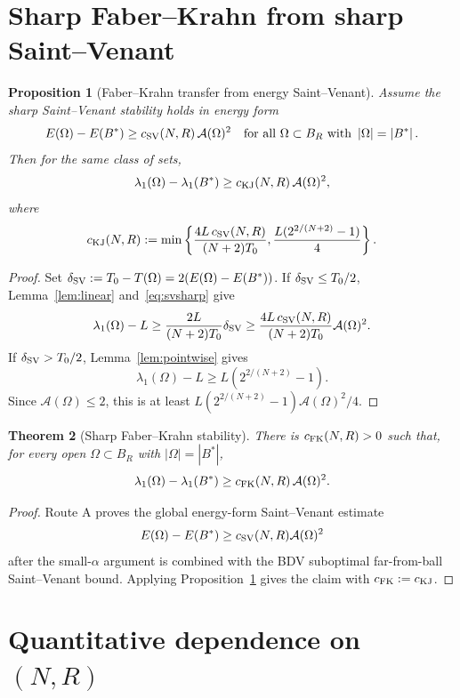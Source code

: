 \documentclass[11pt]{article}
\newtheorem{theorem}{Theorem}
\newtheorem{proposition}[theorem]{Proposition}
\theoremstyle{definition}
\newcommand{\abs}[1]{\left|#1\right|}
\begin{document}
\section{Sharp Faber--Krahn from sharp Saint--Venant}

\begin{proposition}[Faber--Krahn transfer from energy Saint--Venant]\label{prop:svtofk}
Assume the sharp Saint--Venant stability holds in energy form
\begin{equation}\label{eq:svsharp}
E(\Omega)-E(B^*)\ge c_{\rm SV}(N,R)\,\mathcal A(\Omega)^2
\quad\hbox{for all }\Omega\subset B_R\hbox{ with }\abs{\Omega}=\abs{B^*}.
\end{equation}
Then for the same class of sets,
\[
\lambda_1(\Omega)-\lambda_1(B^*)
\ge c_{\rm KJ}(N,R)\,\mathcal A(\Omega)^2,
\]
where
\[
c_{\rm KJ}(N,R):=
\min\left\{
\frac{4L\,c_{\rm SV}(N,R)}{(N+2)T_0},
\frac{L(2^{2/(N+2)}-1)}{4}
\right\}.
\]
\end{proposition}

\begin{proof}
Set $\delta_{\rm SV}:=T_0-T(\Omega)=2(E(\Omega)-E(B^*))$. If
$\delta_{\rm SV}\le T_0/2$, Lemma~\ref{lem:linear} and~\eqref{eq:svsharp}
give
\[
\lambda_1(\Omega)-L
\ge \frac{2L}{(N+2)T_0}\delta_{\rm SV}
\ge \frac{4L\,c_{\rm SV}(N,R)}{(N+2)T_0}\mathcal A(\Omega)^2.
\]
If $\delta_{\rm SV}>T_0/2$, Lemma~\ref{lem:pointwise} gives
\[
\lambda_1(\Omega)-L\ge L\left(2^{2/(N+2)}-1\right).
\]
Since $\mathcal A(\Omega)\le2$, this is at least
$L(2^{2/(N+2)}-1)\mathcal A(\Omega)^2/4$.
\end{proof}

\begin{theorem}[Sharp Faber--Krahn stability]\label{thm:fk}
There is $c_{\rm FK}(N,R)>0$ such that, for every open $\Omega\subset B_R$
with $\abs{\Omega}=\abs{B^*}$,
\[
\lambda_1(\Omega)-\lambda_1(B^*)\ge c_{\rm FK}(N,R)\,\mathcal A(\Omega)^2.
\]
\end{theorem}

\begin{proof}
Route A proves the global energy-form Saint--Venant estimate
\[
E(\Omega)-E(B^*)\ge c_{\rm SV}(N,R)\mathcal A(\Omega)^2
\]
after the small-\(\alpha\) argument is combined with the BDV suboptimal
far-from-ball Saint--Venant bound. Applying Proposition~\ref{prop:svtofk}
gives the claim with \(c_{\rm FK}:=c_{\rm KJ}\).
\end{proof}

\section{Quantitative dependence on \texorpdfstring{$(N,R)$}{(N,R)}}
\end{document}
